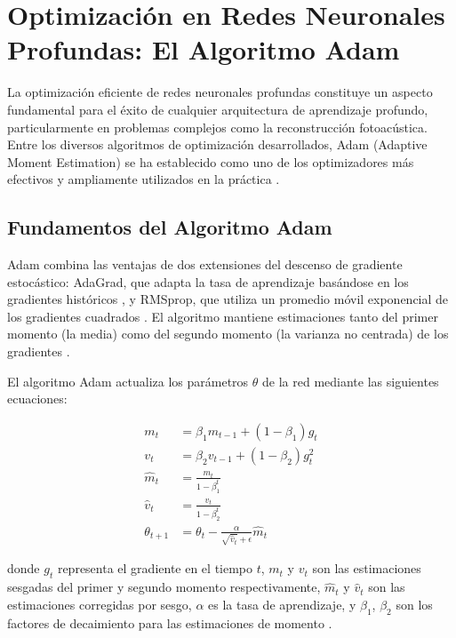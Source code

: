 \section{Optimización en Redes Neuronales Profundas: El Algoritmo Adam}

La optimización eficiente de redes neuronales profundas constituye un aspecto fundamental para el éxito de cualquier arquitectura de aprendizaje profundo, particularmente en problemas complejos como la reconstrucción fotoacústica. Entre los diversos algoritmos de optimización desarrollados, Adam (Adaptive Moment Estimation) se ha establecido como uno de los optimizadores más efectivos y ampliamente utilizados en la práctica \cite{kingma2014adam}.

\subsection{Fundamentos del Algoritmo Adam}

Adam combina las ventajas de dos extensiones del descenso de gradiente estocástico: AdaGrad, que adapta la tasa de aprendizaje basándose en los gradientes históricos \cite{duchi2011adaptive}, y RMSprop, que utiliza un promedio móvil exponencial de los gradientes cuadrados \cite{tieleman2012lecture}. El algoritmo mantiene estimaciones tanto del primer momento (la media) como del segundo momento (la varianza no centrada) de los gradientes \cite{kingma2014adam}.

El algoritmo Adam actualiza los parámetros $\theta$ de la red mediante las siguientes ecuaciones:

\begin{align}
m_t &= \beta_1 m_{t-1} + (1 - \beta_1) g_t \label{eq:adam_m}\\
v_t &= \beta_2 v_{t-1} + (1 - \beta_2) g_t^2 \label{eq:adam_v}\\
\hat{m}_t &= \frac{m_t}{1 - \beta_1^t} \label{eq:adam_m_hat}\\
\hat{v}_t &= \frac{v_t}{1 - \beta_2^t} \label{eq:adam_v_hat}\\
\theta_{t+1} &= \theta_t - \frac{\alpha}{\sqrt{\hat{v}_t} + \epsilon} \hat{m}_t \label{eq:adam_update}
\end{align}

donde $g_t$ representa el gradiente en el tiempo $t$, $m_t$ y $v_t$ son las estimaciones sesgadas del primer y segundo momento respectivamente, $\hat{m}_t$ y $\hat{v}_t$ son las estimaciones corregidas por sesgo, $\alpha$ es la tasa de aprendizaje, y $\beta_1$, $\beta_2$ son los factores de decaimiento para las estimaciones de momento \cite{kingma2014adam}.

